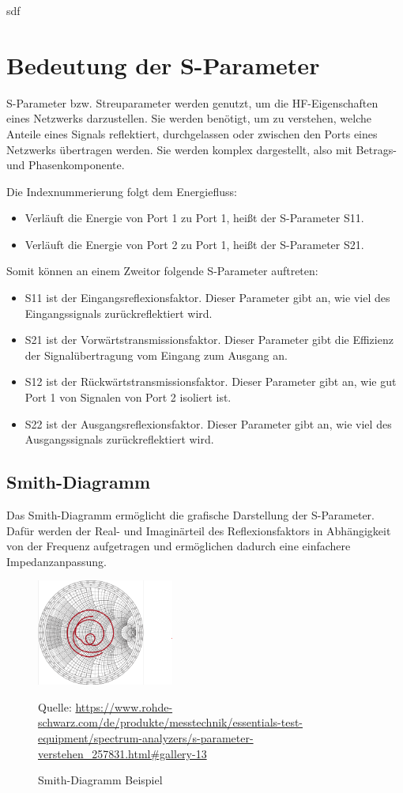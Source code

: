 sdf



\section{Bedeutung der S-Parameter}
S-Parameter bzw. Streuparameter werden genutzt, um die HF-Eigenschaften eines
Netzwerks darzustellen. Sie werden benötigt, um zu verstehen, welche Anteile eines Signals
reflektiert, durchgelassen oder zwischen den Ports eines Netzwerks übertragen werden.
Sie werden komplex dargestellt, also mit Betrags- und Phasenkomponente.

Die Indexnummerierung folgt dem Energiefluss:

\begin{itemize}
    \item Verläuft die Energie von Port 1 zu Port 1, heißt der S-Parameter S11.
    \item Verläuft die Energie von Port 2 zu Port 1, heißt der S-Parameter S21.
\end{itemize}
Somit können an einem Zweitor folgende S-Parameter auftreten:
\begin{itemize}
    \item S11 ist der Eingangsreflexionsfaktor. Dieser Parameter gibt an, wie viel des Eingangssignals zurückreflektiert wird.
    \item S21 ist der Vorwärtstransmissionsfaktor. Dieser Parameter gibt die Effizienz der Signalübertragung vom Eingang zum Ausgang an.
    \item S12 ist der Rückwärtstransmissionsfaktor. Dieser Parameter gibt an, wie gut Port 1 von Signalen von Port 2 isoliert ist.
    \item S22 ist der Ausgangsreflexionsfaktor. Dieser Parameter gibt an, wie viel des Ausgangssignals zurückreflektiert wird.
\end{itemize}

\subsection{Smith-Diagramm}
Das Smith-Diagramm ermöglicht die grafische Darstellung der S-Parameter.
Dafür werden der Real- und Imaginärteil des Reflexionsfaktors in Abhängigkeit von der Frequenz
aufgetragen und ermöglichen dadurch eine einfachere Impedanzanpassung.
\begin{figure}[H]
    \centering
    \includegraphics[width=0.4\textwidth]{Pictures/SmithDiagram.png}
    \caption{Smith-Diagramm Beispiel}
    \footnotesize{Quelle: \url{https://www.rohde-schwarz.com/de/produkte/messtechnik/essentials-test-equipment/spectrum-analyzers/s-parameter-verstehen_257831.html#gallery-13}}
\end{figure}

\clearpage